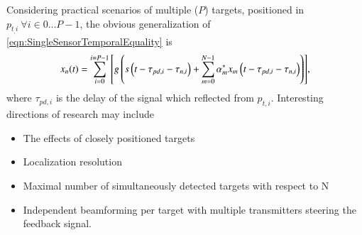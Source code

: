 Considering practical scenarios of multiple ($P$) targets, positioned in $p_{t_,i}\ \forall i\in0\dots{}P-1$, the obvious generalization of \eqref{eqn:SingleSensorTemporalEquality} is 
\begin{equation}
    \label{eqn:ftr_dyn_temp}
    x_{n}(t) = \sum_{i=0}^{i=P-1}{\left[{g\left({s\left({t-\tau_{pd,i}-\tau_{n,i}}\right)
    +\sum_{m=0}^{N-1}{\alpha^{*}_{m}x_{m}\left({t-\tau_{pd,i}-\tau_{n,i}}\right)}}\right)}\right]},
\end{equation}
where $\tau_{pd,i}$ is the delay of the signal which reflected from $p_{t,i}$.
Interesting directions of research may include
\begin{itemize}
    \item The effects of closely positioned targets
    \item Localization resolution
    \item Maximal number of simultaneously detected targets with respect to N
    \item Independent beamforming per target with multiple transmitters steering the feedback signal. 
\end{itemize}